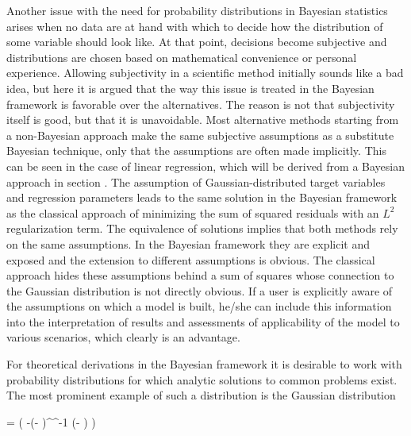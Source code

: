     Another issue with the need for probability distributions in Bayesian
    statistics arises when no data are at hand with which to decide how the
    distribution of some variable should look like. At that point, decisions
    become subjective and distributions are chosen based on mathematical
    convenience or personal experience. Allowing subjectivity in a scientific
    method initially sounds like a bad idea, but here it is argued that the way
    this issue is treated in the Bayesian framework is favorable over the
    alternatives. The reason is not that subjectivity itself is good, but that
    it is unavoidable. Most alternative methods starting from a non-Bayesian
    approach make the same subjective assumptions as a substitute Bayesian
    technique, only that the assumptions are often made implicitly.
    This can be seen in the case of linear regression, which will be derived
    from a Bayesian approach in section . The
    assumption of Gaussian-distributed target variables and regression
    parameters leads to the same solution in the Bayesian framework as the
    classical approach of minimizing the sum of squared residuals with an $L^2$
    regularization term. The equivalence of solutions implies that both methods
    rely on the same assumptions. In the Bayesian framework they are explicit
    and exposed and the extension to different assumptions is obvious. The
    classical approach hides these assumptions behind a sum of squares whose
    connection to the Gaussian distribution is not directly obvious. If a user
    is explicitly aware of the assumptions on which a model is built, he/she
    can include this information into the interpretation of results and
    assessments of applicability of the model to various scenarios, which
    clearly is an advantage.

\stopsection

\startsection[title=The Multivariate Gaussian Distribution]

    For theoretical derivations in the Bayesian framework it is desirable to
    work with probability distributions for which analytic solutions to common
    problems exist. The most prominent example of such a distribution is the
    Gaussian distribution

    \placeformula[eq:gaussian]
    \startformula
        \GAUSS{\VECX}{\MEANVEC}{\COVMAT}
        = 
            \exp \left( -(\VECX - \MEANVEC)^\top \COVMAT^{-1}
            (\VECX - \MEANVEC) \right)
    \stopformula

